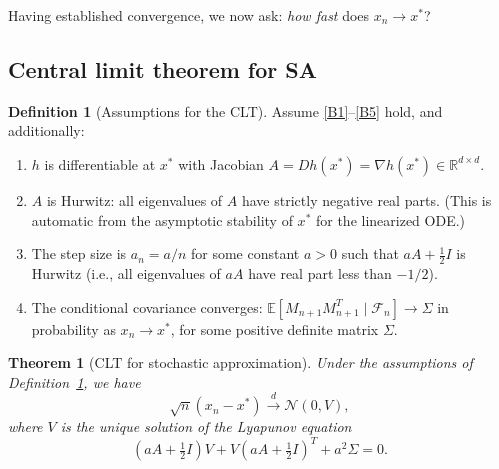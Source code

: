 \documentclass[11pt,a4paper]{article}
\theoremstyle{definition}
\newtheorem{definition}{Definition}[section]
\theoremstyle{plain}
\newtheorem{theorem}{Theorem}[section]
\theoremstyle{remark}
\newcommand{\R}{\mathbb{R}}
\newcommand{\E}{\mathbb{E}}
\newcommand{\cdist}{\xrightarrow{d}}
\begin{document}
Having established convergence, we now ask: \emph{how fast} does $x_n \to x^*$?

\subsection{Central limit theorem for SA}

\begin{definition}[Assumptions for the CLT]
\label{def:clt-assumptions}
Assume \ref{B1}--\ref{B5} hold, and additionally:
\begin{enumerate}[label=(D\arabic*)]
\item \label{D1} $h$ is differentiable at $x^*$ with Jacobian
  $A = Dh(x^*) = \nabla h(x^*) \in \R^{d \times d}$.
\item \label{D2} $A$ is Hurwitz: all eigenvalues of $A$ have strictly negative real
  parts. (This is automatic from the asymptotic stability of $x^*$ for the linearized
  ODE.)
\item \label{D3} The step size is $a_n = a / n$ for some constant $a > 0$ such that
  $aA + \frac{1}{2}I$ is Hurwitz (i.e., all eigenvalues of $aA$ have real part less
  than $-1/2$).
\item \label{D4} The conditional covariance converges:
  $\E[M_{n+1} M_{n+1}^T \mid \mathcal{F}_n] \to \Sigma$ in probability as
  $x_n \to x^*$, for some positive definite matrix $\Sigma$.
\end{enumerate}
\end{definition}

\begin{theorem}[CLT for stochastic approximation]
\label{thm:sa-clt}
Under the assumptions of Definition~\ref{def:clt-assumptions}, we have
\[
  \sqrt{n}(x_n - x^*) \cdist \mathcal{N}(0, V),
\]
where $V$ is the unique solution of the \emph{Lyapunov equation}
\begin{equation}
\label{eq:lyapunov}
  (aA + \tfrac{1}{2}I) V + V (aA + \tfrac{1}{2}I)^T + a^2 \Sigma = 0.
\end{equation}
\end{theorem}
\end{document}
